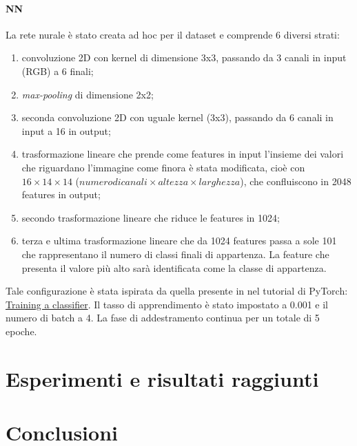 \documentclass[11pt, a4paper, titlepage]{article}
\begin{document}
\paragraph{NN}
La rete nurale è stato creata ad hoc per il dataset e comprende 6 diversi strati:
\begin{enumerate}
    \item convoluzione 2D con kernel di dimensione 3x3, passando da 3 canali in input (RGB) a 6 finali;
    \item \emph{max-pooling} di dimensione 2x2;
    \item seconda convoluzione 2D con uguale kernel (3x3), passando da 6 canali in input a 16 in output;
    \item trasformazione lineare che prende come features in input l'insieme dei valori che riguardano l'immagine come finora è stata modificata, cioè con $16 \times 14 \times 14$ ($numero di canali \times altezza \times larghezza$), che confluiscono in 2048 features in output;
    \item secondo trasformazione lineare che riduce le features in 1024;
    \item terza e ultima trasformazione lineare che da 1024 features passa a sole 101 che rappresentano il numero di classi finali di appartenza. La feature che presenta il valore più alto sarà identificata come la classe di appartenza.
\end{enumerate}
Tale configurazione è stata ispirata da quella presente in nel tutorial di PyTorch: \href{https://pytorch.org/tutorials/beginner/blitz/cifar10_tutorial.html}{Training a classifier}. Il tasso di apprendimento è stato impostato a 0.001 e il numero di batch a 4. La fase di addestramento continua per un totale di 5 epoche. 

\section{Esperimenti e risultati raggiunti}


\section{Conclusioni}

\pagebreak
{}

\end{document}
